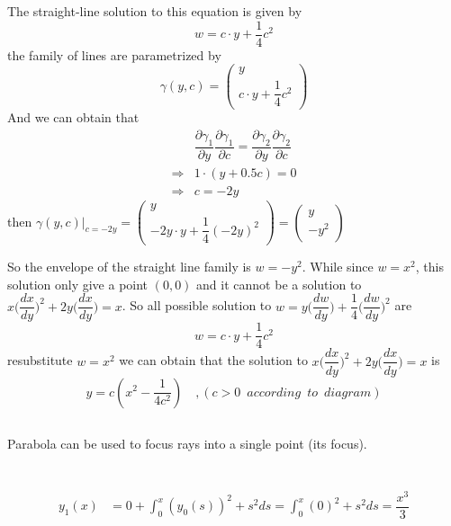 \documentclass[a4paper,12pt,titlepage]{article}
\begin{document}
The straight-line solution to this equation is given by
$$w=c\cdot y+\dfrac{1}{4}c^2$$
the family of lines are parametrized by
$$\gamma(y,c)=\begin{pmatrix}
y\\c\cdot y+\dfrac{1}{4}c^2\end{pmatrix}$$
And we can obtain that
\begin{align*}
&\dfrac{\partial\gamma_1}{\partial y}\dfrac{\partial\gamma_1}{\partial c}=
\dfrac{\partial\gamma_2}{\partial y}
\dfrac{\partial\gamma_2}{\partial c}\\
\Rightarrow&1\cdot(y+0.5c)=0\\
\Rightarrow&c=-2y
\end{align*}
then $\gamma(y,c)\Big|_{c=-2y}=\begin{pmatrix}
y\\-2y\cdot y+\dfrac{1}{4}(-2y)^2\end{pmatrix}=\begin{pmatrix}
y\\-y^2\end{pmatrix}$

So the envelope of the straight line family is $w=-y^2$. While since $w=x^2$, this solution only give a point $(0,0)$ and it cannot be a solution to $x\Big(\dfrac{dx}{dy}\Big)^2+2y\Big(\dfrac{dx}{dy}\Big)=x$. 
So all possible solution to $w=y\Big(\dfrac{dw}{dy}\Big)+\dfrac{1}{4}\Big(\dfrac{dw}{dy}\Big)^2$ are 
$$w=c\cdot y+\dfrac{1}{4}c^2$$
resubstitute $w = x^2$ we can obtain that the solution to $x\Big(\dfrac{dx}{dy}\Big)^2+2y\Big(\dfrac{dx}{dy}\Big)=x$ is
$$y=c(x^2-\dfrac{1}{4c^2})\,\,\,\,\,\,,(c>0 \,\,\,according\,\,\,to\,\,\,diagram)$$

\subsection{}
Parabola can be used to focus rays into a
single point (its focus).

\section{}
\subsection{}
\begin{align*}
y_{1}(x)&=0+\int_0^x(y_0(s))^2+s^2ds
=\int_0^x(0)^2+s^2ds
=\dfrac{x^3}{3}
\end{align*}
\end{document}
